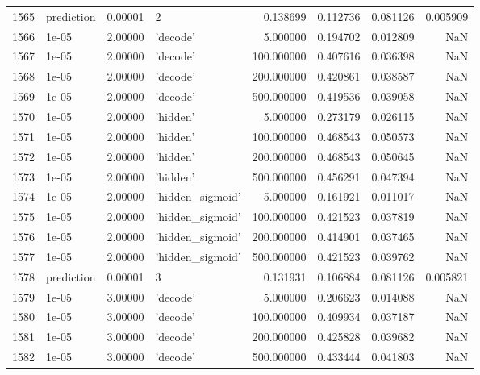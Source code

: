 \documentclass[10pt,a4paper]{article}
\begin{document}
\begin{tabular}{llrlrrrr}
1565 &  prediction &   0.00001 &                  2 &    0.138699 &  0.112736 &  0.081126 &  0.005909 \\
1566 &       1e-05 &   2.00000 &           'decode' &    5.000000 &  0.194702 &  0.012809 &       NaN \\
1567 &       1e-05 &   2.00000 &           'decode' &  100.000000 &  0.407616 &  0.036398 &       NaN \\
1568 &       1e-05 &   2.00000 &           'decode' &  200.000000 &  0.420861 &  0.038587 &       NaN \\
1569 &       1e-05 &   2.00000 &           'decode' &  500.000000 &  0.419536 &  0.039058 &       NaN \\
1570 &       1e-05 &   2.00000 &           'hidden' &    5.000000 &  0.273179 &  0.026115 &       NaN \\
1571 &       1e-05 &   2.00000 &           'hidden' &  100.000000 &  0.468543 &  0.050573 &       NaN \\
1572 &       1e-05 &   2.00000 &           'hidden' &  200.000000 &  0.468543 &  0.050645 &       NaN \\
1573 &       1e-05 &   2.00000 &           'hidden' &  500.000000 &  0.456291 &  0.047394 &       NaN \\
1574 &       1e-05 &   2.00000 &   'hidden\_sigmoid' &    5.000000 &  0.161921 &  0.011017 &       NaN \\
1575 &       1e-05 &   2.00000 &   'hidden\_sigmoid' &  100.000000 &  0.421523 &  0.037819 &       NaN \\
1576 &       1e-05 &   2.00000 &   'hidden\_sigmoid' &  200.000000 &  0.414901 &  0.037465 &       NaN \\
1577 &       1e-05 &   2.00000 &   'hidden\_sigmoid' &  500.000000 &  0.421523 &  0.039762 &       NaN \\
1578 &  prediction &   0.00001 &                  3 &    0.131931 &  0.106884 &  0.081126 &  0.005821 \\
1579 &       1e-05 &   3.00000 &           'decode' &    5.000000 &  0.206623 &  0.014088 &       NaN \\
1580 &       1e-05 &   3.00000 &           'decode' &  100.000000 &  0.409934 &  0.037187 &       NaN \\
1581 &       1e-05 &   3.00000 &           'decode' &  200.000000 &  0.425828 &  0.039682 &       NaN \\
1582 &       1e-05 &   3.00000 &           'decode' &  500.000000 &  0.433444 &  0.041803 &       NaN \\

\end{tabular}
\end{document}
